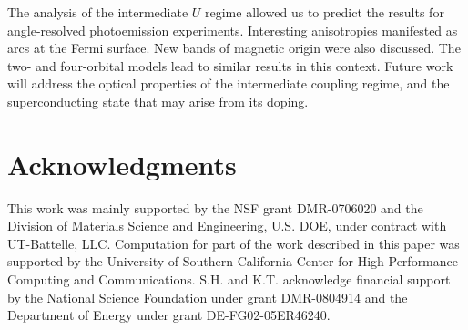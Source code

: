 \documentclass[aps,prb,superscriptaddress,preprintnumbers,
showpacs,legalpaper,twoside,twocolumn,amsmath,amssymb]{revtex4}
\begin{document}
The analysis of the intermediate $U$ regime allowed us to predict the results for
angle-resolved  photoemission experiments. Interesting anisotropies manifested
as arcs at the Fermi surface. New bands of magnetic origin were also discussed.
The two- and four-orbital models lead to similar results
in this context.
Future work will address the optical properties
of the intermediate coupling regime, and the superconducting state
that may arise from its doping.

\section{Acknowledgments}
This work was mainly supported by the NSF grant DMR-0706020 and the
Division of Materials Science and Engineering, U.S. DOE, under contract
with UT-Battelle, LLC.
Computation for part of the work described in this paper was supported by the
University of Southern California Center for High Performance Computing
and Communications. S.H. and K.T. acknowledge financial support by the National
Science Foundation under grant DMR-0804914 and the Department of Energy
under grant DE-FG02-05ER46240.


%
%
\end{document}
